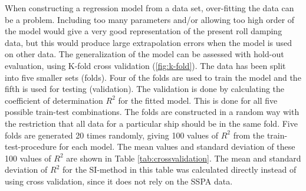\noindent When constructing a regression model from a data set, over-fitting the data can be a problem. Including too many parameters and/or allowing too high order of the model would give a very good representation of the present roll damping data, but this would produce large extrapolation errors when the model is used on other data. The generalization of the model can be assessed with hold-out evaluation, using K-fold cross validation \cite{mosteller_data_1968} (\autoref{fig:k-fold}). The data has been split into five smaller sets (folds). Four of the folds are used to train the model and the fifth is used for testing (validation). The validation is done by calculating the coefficient of determination $R^2$ for the fitted model. This is done for all five possible train-test combinations. 
The folds are constructed in a random way with the restriction that all data for a particular ship should be in the same fold. Five folds are generated 20 times randomly, giving 100 values of $R^2$ from the train-test-procedure for each model. The mean values and standard deviation of these 100 values of $R^2$ are shown in Table \ref{tab:crossvalidation}. The mean and standard deviation of $R^2$ for the SI-method in this table was calculated directly instead of using cross validation, since it does not rely on the SSPA data.

